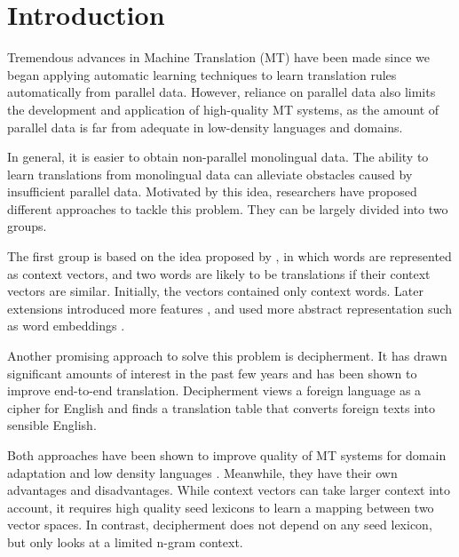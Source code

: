 \section{Introduction}

Tremendous advances in Machine Translation (MT) have been made since we began applying automatic learning techniques to learn translation rules automatically from parallel data. However, reliance on parallel data also limits the development and application of high-quality MT systems, as the amount of parallel data is far from adequate in low-density languages and domains.

In general, it is easier to obtain non-parallel monolingual data. The ability to learn translations from monolingual data can alleviate obstacles caused by insufficient parallel data.  Motivated by this idea, researchers have proposed different approaches to tackle this problem. They can be largely divided into two groups. 

The first group is based on the idea proposed by , in which words are represented as context vectors, and two words are likely to be translations if their context vectors are similar. Initially, the vectors contained only context words. Later extensions introduced more features \cite{haghighi-EtAl:2008:ACLMain,Garera:2009,Bergsma:2011,Daume:2011:DAM:2002736.2002819,irvine-callisonburch:2013,irvine-callisonburch:2013:WMT}, and used more abstract representation such as word embeddings \cite{KlementievCOLING}.

Another promising approach to solve this problem is decipherment. It has drawn significant amounts of interest in the past few years \cite{ravi-knight:2011,Nuhn:2012,dou-knight:2013:EMNLP,ravi:2013} and has been shown to improve end-to-end translation. Decipherment views a foreign language as a cipher for English and finds a translation table that converts foreign texts into sensible English. 

Both approaches have been shown to improve quality of MT systems for domain adaptation \cite{Daume:2011:DAM:2002736.2002819,Dou:2012,irvineQuirkDaumeEMNLP13} and low density languages \cite{irvine-callisonburch:2013:WMT,dou-vaswani-knight:2014:EMNLP2014}. Meanwhile, they have their own advantages and disadvantages. While context vectors can take larger context into account, it requires high quality seed lexicons to learn a mapping between two vector spaces. In contrast, decipherment does not depend on any seed lexicon, but only looks at a limited n-gram context.  

